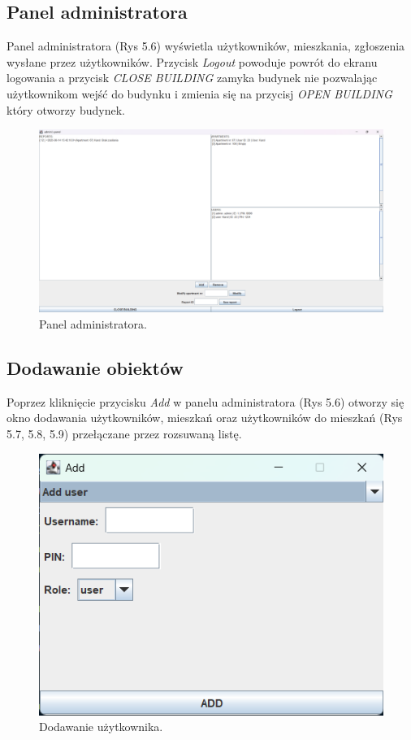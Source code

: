 \subsection{Panel administratora}
Panel administratora (Rys 5.6) wyświetla użytkowników, mieszkania, zgłoszenia wysłane przez użytkowników.
Przycisk \textit{Logout} powoduje powrót do ekranu logowania a przycisk \textit{CLOSE BUILDING} zamyka budynek nie pozwalając użytkownikom 
wejść do budynku i zmienia się na przycisj \textit{OPEN BUILDING} który otworzy budynek.
\begin{figure}[H]
    \centering
    \includegraphics[width=\textwidth,height=0.8\textheight,keepaspectratio]{figures/app-images/admin-panel.png}
    \caption{Panel administratora.\label{fig11}}
\end{figure}

\newpage
\subsection{Dodawanie obiektów}
Poprzez kliknięcie przycisku \textit{Add} w panelu administratora (Rys 5.6) otworzy się okno dodawania użytkowników, mieszkań 
oraz użytkowników do mieszkań (Rys 5.7, 5.8, 5.9) przełączane przez rozsuwaną listę.

\begin{figure}[H]
    \centering
    \includegraphics[width=\textwidth,height=0.2\textheight,keepaspectratio]{figures/app-images/Add/add-user.png}
    \caption{Dodawanie użytkownika.\label{fig12}}
\end{figure}

